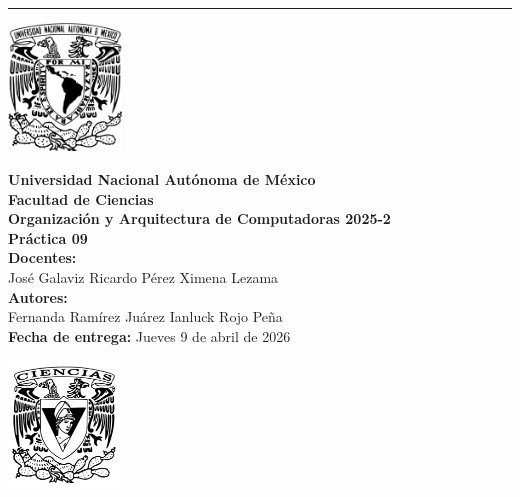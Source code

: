 \documentclass[12pt,letterpaper]{article}
\begin{document}
\hrule height 0.1pt
\bigskip
\begin{center}
  \begin{minipage}{3cm}
    \begin{center}
      \includegraphics[height=3.4cm]{../unam_logo.png}
    \end{center}
  \end{minipage}\hfill
  \begin{minipage}{10cm}
    \begin{center}
      \textbf{\Large Universidad Nacional Autónoma de México}\\[0.2cm]
      \textbf{\large Facultad de Ciencias}\\[0.2cm]
      \textbf{Organización y Arquitectura de Computadoras 2025-2}\\[0.4cm]
      \textbf{\Large Práctica 09}\\[0.1cm]
      \textbf{Docentes:}\\
      José Galaviz \hspace{1em} Ricardo Pérez \hspace{1em} Ximena Lezama\\[0.3cm]
      \textbf{Autores:}\\
      Fernanda Ramírez Juárez \quad Ianluck Rojo Peña\\[0.3cm]
      \textbf{Fecha de entrega:} Jueves 9 de abril de 2026
    \end{center}
  \end{minipage}\hfill
  \begin{minipage}{3cm}
    \begin{center}
      \includegraphics[height=3.4cm]{../fc_logo.png}
    \end{center}
  \end{minipage}
\end{center}
\end{document}
